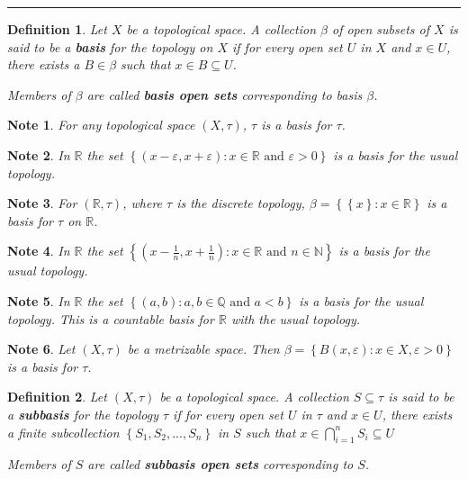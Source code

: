 \documentclass[14pt,twoside]{extreport}
\newcommand{\hhrule}{\vspace{1cm}\hrule\vspace{1cm}}
\theoremstyle{dotless}
\newtheorem*{defn}{Definition}
\newtheorem*{note}{Note} %
\begin{document}
\hhrule

\begin{defn}
    Let $X$ be a topological space. A collection $\beta$ of open subsets of $X$ is said to be a \textbf{basis} for the topology on $X$ if for every open set $U$ in $X$ and $x \in U$, there exists a $B \in \beta$ such that $x \in B \subseteq U$.

    Members of $\beta$ are called \textbf{basis open sets} corresponding to basis $\beta$.
\end{defn}

\begin{note}
    For any topological space $\left (X, \tau\right )$, $\tau$ is a basis for $\tau$.
\end{note}

\begin{note}
    In $\mathbb{R}$ the set $\left\{ \left (x - \varepsilon, x + \varepsilon\right )  :  x \in \mathbb{R}\text{ and }\varepsilon >0 \right\}$ is a basis for the usual topology.
\end{note}

\begin{note}
    For $\left (\mathbb{R}, \tau\right )$, where $\tau$ is the discrete topology, $\beta = \left\{ \left\{ x \right\}  :  x \in \mathbb{R} \right\}$ is a basis for $\tau$ on $\mathbb{R}$.
\end{note}

\begin{note}
    In $\mathbb{R}$ the set $\left\{ \left (x - \frac{1}{n}, x + \frac{1}{n}\right )  :  x \in \mathbb{R}\text{ and }n \in \mathbb{N} \right\}$ is a basis for the usual topology.
\end{note}

\begin{note}
    In $\mathbb{R}$ the set $\left\{ \left (a, b\right )  :  a,b \in \mathbb{Q}\text{ and }a < b \right\}$ is a basis for the usual topology. This is a countable basis for $\mathbb{R}$ with the usual topology.
\end{note}

\begin{note}
    Let $\left (X, \tau\right )$ be a metrizable space. Then $\beta = \left\{ B\left (x, \varepsilon\right )  :  x \in X, \varepsilon >0 \right\}$ is a basis for $\tau$.
\end{note}

\begin{defn}
    Let $\left (X, \tau\right )$ be a topological space. A collection $S \subseteq \tau$ is said to be a \textbf{subbasis} for the topology $\tau$ if for every open set $U$ in $\tau$ and $x \in U$, there exists a finite subcollection $\left\{ S_1, S_2, ..., S_n \right\}$ in $S$ such that $x \in \displaystyle\bigcap_{i = 1}^n S_i \subseteq U$

    Members of $S$ are called \textbf{subbasis open sets} corresponding to $S$.
\end{defn}
\end{document}
